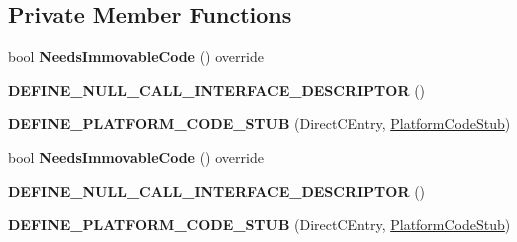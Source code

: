 \subsection*{Private Member Functions}
\begin{DoxyCompactItemize}
\item 
bool {\bfseries Needs\+Immovable\+Code} () override\hypertarget{classv8_1_1internal_1_1_direct_c_entry_stub_a340e1e33a6ac2174c27d88a912d4ffa5}{}\label{classv8_1_1internal_1_1_direct_c_entry_stub_a340e1e33a6ac2174c27d88a912d4ffa5}

\item 
{\bfseries D\+E\+F\+I\+N\+E\+\_\+\+N\+U\+L\+L\+\_\+\+C\+A\+L\+L\+\_\+\+I\+N\+T\+E\+R\+F\+A\+C\+E\+\_\+\+D\+E\+S\+C\+R\+I\+P\+T\+OR} ()\hypertarget{classv8_1_1internal_1_1_direct_c_entry_stub_a2e23f5d604b369d53c99765704e01df0}{}\label{classv8_1_1internal_1_1_direct_c_entry_stub_a2e23f5d604b369d53c99765704e01df0}

\item 
{\bfseries D\+E\+F\+I\+N\+E\+\_\+\+P\+L\+A\+T\+F\+O\+R\+M\+\_\+\+C\+O\+D\+E\+\_\+\+S\+T\+UB} (Direct\+C\+Entry, \hyperlink{classv8_1_1internal_1_1_platform_code_stub}{Platform\+Code\+Stub})\hypertarget{classv8_1_1internal_1_1_direct_c_entry_stub_ae32a88d000afb47947a812cbad8d6a22}{}\label{classv8_1_1internal_1_1_direct_c_entry_stub_ae32a88d000afb47947a812cbad8d6a22}

\item 
bool {\bfseries Needs\+Immovable\+Code} () override\hypertarget{classv8_1_1internal_1_1_direct_c_entry_stub_a340e1e33a6ac2174c27d88a912d4ffa5}{}\label{classv8_1_1internal_1_1_direct_c_entry_stub_a340e1e33a6ac2174c27d88a912d4ffa5}

\item 
{\bfseries D\+E\+F\+I\+N\+E\+\_\+\+N\+U\+L\+L\+\_\+\+C\+A\+L\+L\+\_\+\+I\+N\+T\+E\+R\+F\+A\+C\+E\+\_\+\+D\+E\+S\+C\+R\+I\+P\+T\+OR} ()\hypertarget{classv8_1_1internal_1_1_direct_c_entry_stub_a2e23f5d604b369d53c99765704e01df0}{}\label{classv8_1_1internal_1_1_direct_c_entry_stub_a2e23f5d604b369d53c99765704e01df0}

\item 
{\bfseries D\+E\+F\+I\+N\+E\+\_\+\+P\+L\+A\+T\+F\+O\+R\+M\+\_\+\+C\+O\+D\+E\+\_\+\+S\+T\+UB} (Direct\+C\+Entry, \hyperlink{classv8_1_1internal_1_1_platform_code_stub}{Platform\+Code\+Stub})\hypertarget{classv8_1_1internal_1_1_direct_c_entry_stub_ae32a88d000afb47947a812cbad8d6a22}{}\label{classv8_1_1internal_1_1_direct_c_entry_stub_ae32a88d000afb47947a812cbad8d6a22}


\end{DoxyCompactItemize}
